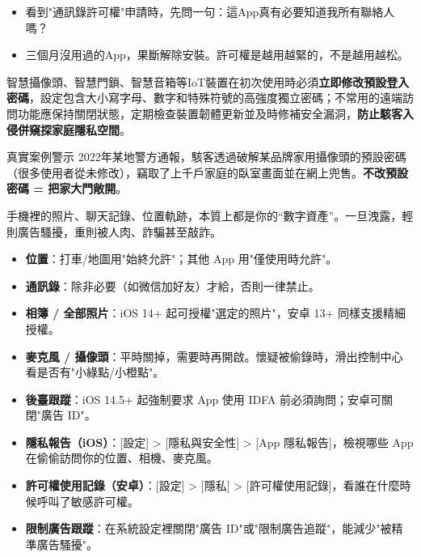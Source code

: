\begin{itemize}
  \item 看到"通訊錄許可權"申請時，先問一句：這App真有必要知道我所有聯絡人嗎？
  \item 三個月沒用過的App，果斷解除安裝。許可權是越用越緊的，不是越用越松。
\end{itemize}


智慧攝像頭、智慧門鎖、智慧音箱等IoT裝置在初次使用時必須\textbf{立即修改預設登入密碼}，設定包含大小寫字母、數字和特殊符號的高強度獨立密碼；不常用的遠端訪問功能應保持關閉狀態，定期檢查裝置韌體更新並及時修補安全漏洞，\textbf{防止駭客入侵併窺探家庭隱私空間}。

\begin{tcbwarn}{真實案例警示}
2022年某地警方通報，駭客透過破解某品牌家用攝像頭的預設密碼（很多使用者從未修改），竊取了上千戶家庭的臥室畫面並在網上兜售。\textbf{不改預設密碼 = 把家大門敞開}。

\end{tcbwarn}


手機裡的照片、聊天記錄、位置軌跡，本質上都是你的“數字資產”。一旦洩露，輕則廣告騷擾，重則被人肉、詐騙甚至敲詐。


\begin{itemize}
  \item \textbf{位置}：打車/地圖用"始終允許"；其他 App 用"僅使用時允許"。
  \item \textbf{通訊錄}：除非必要（如微信加好友）才給，否則一律禁止。
  \item \textbf{相簿 / 全部照片}：iOS 14+ 起可授權"選定的照片"，安卓 13+ 同樣支援精細授權。
  \item \textbf{麥克風 / 攝像頭}：平時關掉，需要時再開啟。懷疑被偷錄時，滑出控制中心看是否有"小綠點/小橙點"。
  \item \textbf{後臺跟蹤}：iOS 14.5+ 起強制要求 App 使用 IDFA 前必須詢問；安卓可關閉"廣告 ID"。
\end{itemize}


\begin{itemize}
  \item \textbf{隱私報告（iOS）}：[設定] > [隱私與安全性] > [App 隱私報告]，檢視哪些 App 在偷偷訪問你的位置、相機、麥克風。
  \item \textbf{許可權使用記錄（安卓）}：[設定] > [隱私] > [許可權使用記錄]，看誰在什麼時候呼叫了敏感許可權。
  \item \textbf{限制廣告跟蹤}：在系統設定裡關閉"廣告 ID"或"限制廣告追蹤"，能減少"被精準廣告騷擾"。
\end{itemize}

